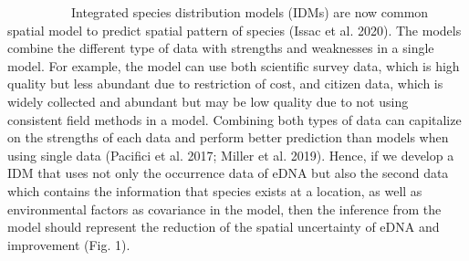 \documentclass[12pt]{article}
\begin{document}
\begin{linenumbers}
\ \ \ \ \ \ \ \ \ \ 
Integrated species distribution models (IDMs) are now common spatial model to predict spatial pattern of species (Issac et al. 2020).
The models combine the different type of data with strengths and weaknesses in a single model. For example, the model can use both scientific survey data, which is high quality but less abundant due to restriction of cost, and citizen data, which is widely collected and abundant but may be low quality due to not using consistent field methods in a model.
Combining both types of data can capitalize on the strengths of each data and perform better prediction than models when using single data (Pacifici et al. 2017; Miller et al. 2019). 
Hence, if we develop a IDM that uses not only the occurrence data of eDNA but also the second data which contains the information that species exists at a location, as well as environmental factors as covariance in the model, then the inference from the model should represent the reduction of the spatial uncertainty of eDNA and improvement (Fig. 1).



\end{linenumbers}
\end{document}
